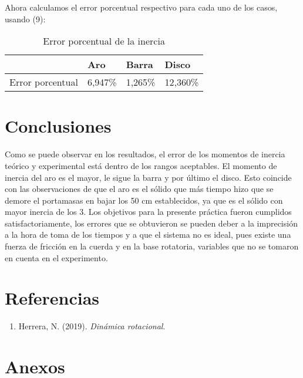\documentclass[a4paper]{article}
\begin{document}
Ahora calculamos el error porcentual respectivo para cada uno de los casos, usando (9):

\begin{table}[H]
    \centering
    \begin{tabular}{|l|l|l|l|}
    \hline
        ~ & Aro & Barra & Disco  \\ \hline
        Error porcentual & 6,947\% & 1,265\% & 12,360\%  \\ \hline
    \end{tabular}
    \caption{Error porcentual de la inercia}
\end{table}

\section{Conclusiones}
Como se puede observar en los resultados, el error de los momentos de inercia teórico y experimental está dentro de los rangos aceptables. El momento de inercia del aro es el mayor, le sigue la barra y por último el disco. Esto coincide con las observaciones de que el aro es el sólido que más tiempo hizo que se demore el portamasas en bajar los 50 cm establecidos, ya que es el sólido con mayor inercia de los 3. Los objetivos para la presente práctica fueron cumplidos satisfactoriamente, los errores que se obtuvieron se pueden deber a la imprecisión a la hora de toma de los tiempos y a que el sistema no es ideal, pues existe una fuerza de fricción en la cuerda y en la base rotatoria, variables que no se tomaron en cuenta en el experimento.


\section{Referencias}

\begin{enumerate}
    \item Herrera, N. (2019). \textit{Dinámica rotacional}.
\end{enumerate}


\section{Anexos}
\end{document}
